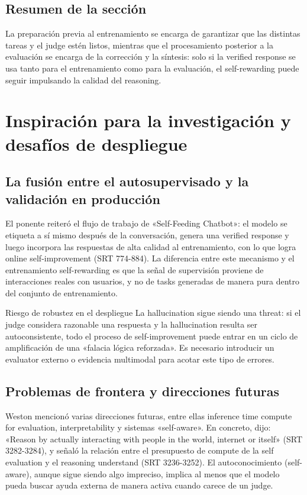 \documentclass[a4paper]{article}
\begin{document}
\subsection{Resumen de la sección}
La preparación previa al entrenamiento se encarga de garantizar que las distintas tareas y el judge estén listos, mientras que el procesamiento posterior a la evaluación se encarga de la corrección y la síntesis: solo si la verified response se usa tanto para el entrenamiento como para la evaluación, el self-rewarding puede seguir impulsando la calidad del reasoning.

\section{Inspiración para la investigación y desafíos de despliegue}
\subsection{La fusión entre el autosupervisado y la validación en producción}
El ponente reiteró el flujo de trabajo de «Self-Feeding Chatbot»: el modelo se etiqueta a sí mismo después de la conversación, genera una verified response y luego incorpora las respuestas de alta calidad al entrenamiento, con lo que logra online self-improvement (SRT 774-884). La diferencia entre este mecanismo y el entrenamiento self-rewarding es que la señal de supervisión proviene de interacciones reales con usuarios, y no de tasks generadas de manera pura dentro del conjunto de entrenamiento.

\begin{warningbox}{Riesgo de robustez en el despliegue}
La hallucination sigue siendo una threat: si el judge considera razonable una respuesta y la hallucination resulta ser autoconsistente, todo el proceso de self-improvement puede entrar en un ciclo de amplificación de una «falacia lógica reforzada». Es necesario introducir un evaluator externo o evidencia multimodal para acotar este tipo de errores.
\end{warningbox}

\subsection{Problemas de frontera y direcciones futuras}
Weston mencionó varias direcciones futuras, entre ellas inference time compute for evaluation, interpretability y sistemas «self-aware». En concreto, dijo: «Reason by actually interacting with people in the world, internet or itself» (SRT 3282-3284), y señaló la relación entre el presupuesto de compute de la self evaluation y el reasoning understand (SRT 3236-3252). El autoconocimiento (self-aware), aunque sigue siendo algo impreciso, implica al menos que el modelo pueda buscar ayuda externa de manera activa cuando carece de un judge.
\end{document}
